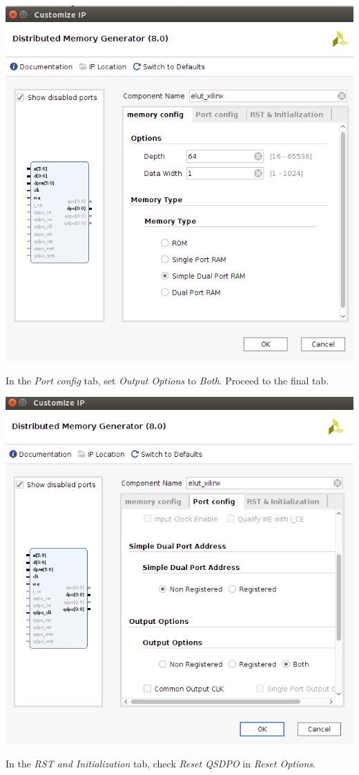 \documentclass{article}
\begin{document}
\begin{enumerate}
    \includegraphics[width=0.7\linewidth]{Figures/vivado13.png}

    In the \emph{Port config} tab, set \emph{Output Options} to \emph{Both}. Proceed to the final tab.

    \includegraphics[width=0.7\linewidth]{Figures/vivado14.png}

    In the \emph{RST and Initialization} tab, check \emph{Reset QSDPO} in \emph{Reset Options}.


\end{enumerate}
\end{document}
